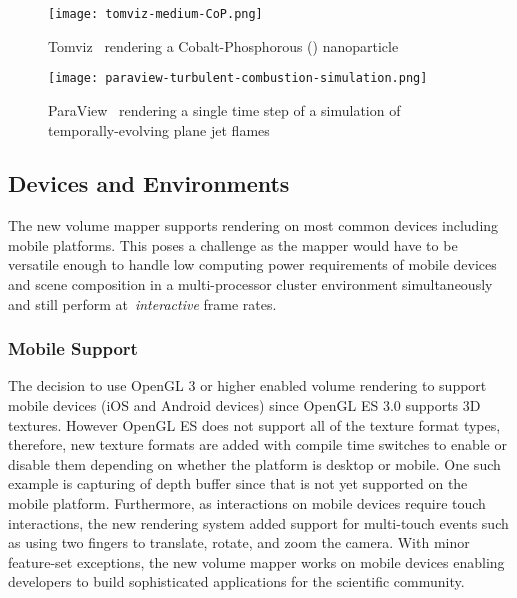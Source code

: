 \begin{figure}[ht]
  \centering
  \texttt{[image: tomviz-medium-CoP.png]}
  \caption{Tomviz~\protect\citep{hanwell_tomviz_2014} rendering a
    Cobalt-Phosphorous ()
    nanoparticle~\protect\citep{levin_nanomaterial_2016}}
  \label{fig:tomviz-cop}
\end{figure}

\begin{figure}[ht]
  \centering
  \texttt{[image: paraview-turbulent-combustion-simulation.png]}
  \caption{ParaView~\protect\citep{ahrens_paraview:_2005, ayachit_paraview_2015,
  ayachit_paraview_2015-1} rendering a single time step of a simulation of
  temporally-evolving plane jet
  flames~\protect\citep{hiroshi_akiba_visualizing_2007}}
  \label{fig:paraview-turbulent-combustion}
\end{figure}

\subsection{Devices and Environments}
\label{devices-and-environments}
The new volume mapper supports rendering on most common devices including mobile
platforms.  This poses a challenge as the mapper would have to be versatile
enough to handle low computing power requirements of mobile devices and scene
composition in a multi-processor cluster environment simultaneously and still
perform at~\textit{interactive} frame rates. 

\subsubsection{Mobile Support}
\label{mobile}
The decision to use OpenGL 3 or higher enabled volume rendering to support
mobile devices (iOS and Android devices) since OpenGL ES 3.0 supports 3D textures.
However OpenGL ES does not support all of the texture format types, therefore,
new texture formats are added with compile time switches to enable or
disable them depending on whether the platform is desktop or mobile. One such
example is capturing of depth buffer since that is not yet supported on the
mobile platform.  Furthermore, as interactions on mobile devices require touch
interactions, the new rendering system added support for multi-touch events
such as using two fingers to translate, rotate, and zoom the camera. With minor
feature-set exceptions, the new volume mapper works on mobile devices enabling
developers to build sophisticated applications for the scientific community.

